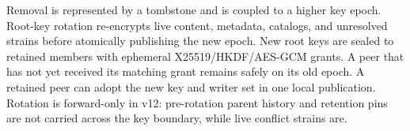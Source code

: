 Removal is represented by a tombstone and is coupled to a higher key epoch.
Root-key rotation re-encrypts live content, metadata, catalogs, and unresolved
strains before atomically publishing the new epoch.  New root keys are sealed
to retained members with ephemeral X25519/HKDF/AES-GCM grants.  A peer that has
not yet received its matching grant remains safely on its old epoch.  A retained
peer can adopt the new key and writer set in one local publication.  Rotation is
forward-only in v12: pre-rotation parent history and retention pins are not
carried across the key boundary, while live conflict strains are.
